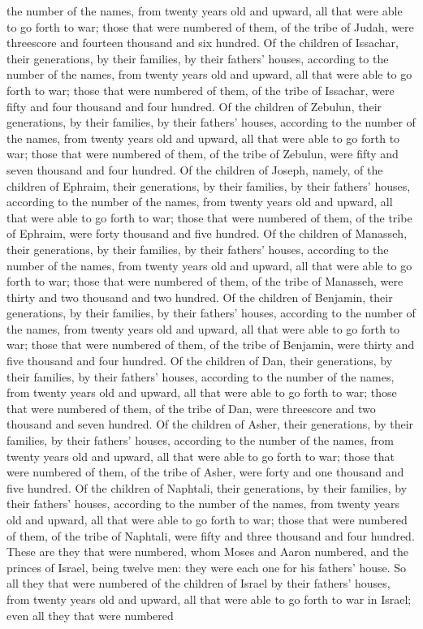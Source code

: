 the number of the names, from twenty years old and upward, all that were able to go forth to war; those that were numbered of them, of the tribe of Judah, were threescore and fourteen thousand and six hundred.  Of the children of Issachar, their generations, by their families, by their fathers’ houses, according to the number of the names, from twenty years old and upward, all that were able to go forth to war; those that were numbered of them, of the tribe of Issachar, were fifty and four thousand and four hundred.  Of the children of Zebulun, their generations, by their families, by their fathers’ houses, according to the number of the names, from twenty years old and upward, all that were able to go forth to war; those that were numbered of them, of the tribe of Zebulun, were fifty and seven thousand and four hundred.  Of the children of Joseph, namely, of the children of Ephraim, their generations, by their families, by their fathers’ houses, according to the number of the names, from twenty years old and upward, all that were able to go forth to war; those that were numbered of them, of the tribe of Ephraim, were forty thousand and five hundred.  Of the children of Manasseh, their generations, by their families, by their fathers’ houses, according to the number of the names, from twenty years old and upward, all that were able to go forth to war; those that were numbered of them, of the tribe of Manasseh, were thirty and two thousand and two hundred.  Of the children of Benjamin, their generations, by their families, by their fathers’ houses, according to the number of the names, from twenty years old and upward, all that were able to go forth to war; those that were numbered of them, of the tribe of Benjamin, were thirty and five thousand and four hundred.  Of the children of Dan, their generations, by their families, by their fathers’ houses, according to the number of the names, from twenty years old and upward, all that were able to go forth to war; those that were numbered of them, of the tribe of Dan, were threescore and two thousand and seven hundred.  Of the children of Asher, their generations, by their families, by their fathers’ houses, according to the number of the names, from twenty years old and upward, all that were able to go forth to war; those that were numbered of them, of the tribe of Asher, were forty and one thousand and five hundred.  Of the children of Naphtali, their generations, by their families, by their fathers’ houses, according to the number of the names, from twenty years old and upward, all that were able to go forth to war; those that were numbered of them, of the tribe of Naphtali, were fifty and three thousand and four hundred.  These are they that were numbered, whom Moses and Aaron numbered, and the princes of Israel, being twelve men: they were each one for his fathers’ house. So all they that were numbered of the children of Israel by their fathers’ houses, from twenty years old and upward, all that were able to go forth to war in Israel; even all they that were numbered 